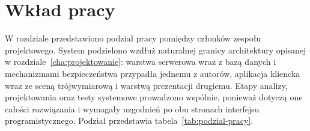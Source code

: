 
\chapter{Wkład pracy}
\label{cha:wklad-pracy}

W rozdziale przedstawiono podział pracy pomiędzy członków zespołu projektowego. System podzielono wzdłuż naturalnej granicy architektury opisanej w rozdziale~\ref{cha:projektowanie}: warstwa serwerowa wraz z bazą danych i mechanizmami bezpieczeństwa przypadła jednemu z autorów, aplikacja kliencka wraz ze sceną trójwymiarową i warstwą prezentacji drugiemu. Etapy analizy, projektowania oraz testy systemowe prowadzono wspólnie, ponieważ dotyczą one całości rozwiązania i wymagały uzgodnień po obu stronach interfejsu programistycznego. Podział przedstawia tabela~\ref{tab:podzial-pracy}.


